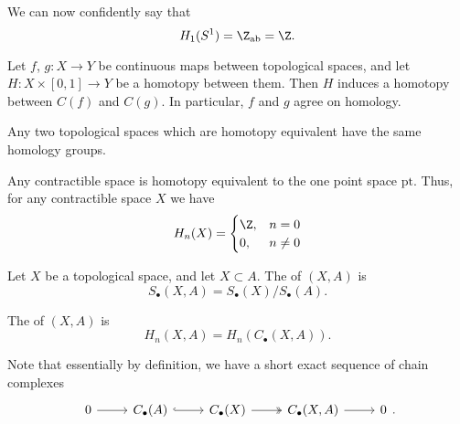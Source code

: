 \documentclass[main.tex]{subfiles}
\begin{document}
\begin{example}
  We can now confidently say that
  \begin{equation*}
    H_{1}(S^{1}) = \Z_{\mathrm{ab}} = \Z.
  \end{equation*}
\end{example}

\begin{proposition}
  Let $f$, $g\colon X \to Y$ be continuous maps between topological spaces, and let $H\colon X \times [0, 1] \to Y$ be a homotopy between them. Then $H$ induces a homotopy between $C(f)$ and $C(g)$. In particular, $f$ and $g$ agree on homology.
\end{proposition}

\begin{corollary}
  Any two topological spaces which are homotopy equivalent have the same homology groups.
\end{corollary}

\begin{example}
  Any contractible space is homotopy equivalent to the one point space $\mathrm{pt}$. Thus, for any contractible space $X$ we have
  \begin{equation*}
    H_{n}(X) =
    \begin{cases}
      \Z, &n = 0 \\
      0, &n \neq 0
    \end{cases}
  \end{equation*}
\end{example}

\begin{definition}
  \label{def:relative_homology}
  Let $X$ be a topological space, and let $X \subset A$. The  of $(X, A)$ is
  \begin{equation*}
    S_{\bullet}(X, A) = S_{\bullet}(X) / S_{\bullet}(A).
  \end{equation*}

  The  of $(X, A)$ is
  \begin{equation*}
    H_{n}(X, A) = H_{n}(C_{\bullet}(X, A)).
  \end{equation*}
\end{definition}

Note that essentially by definition, we have a short exact sequence of chain complexes
\begin{equation*}
  \begin{tikzcd}
    0
    \arrow[r]
    & C_{\bullet}(A)
    \arrow[r, hook]
    & C_{\bullet}(X)
    \arrow[r, two heads]
    & C_{\bullet}(X, A)
    \arrow[r]
    & 0
  \end{tikzcd}.
\end{equation*}
\end{document}
